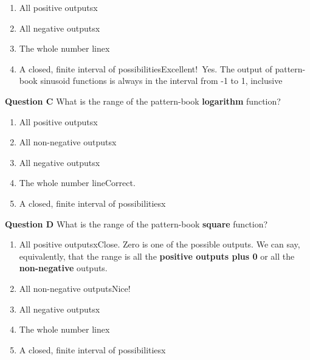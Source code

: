 \documentclass[
  letterpaper,
  DIV=11,
  numbers=noendperiod,
  oneside]{article}
\providecommand{\tightlist}{%
  \setlength{\itemsep}{0pt}\setlength{\parskip}{0pt}}\usepackage{longtable,booktabs,array}
\begin{document}
\begin{multicols}{2}
\begin{enumerate}
\def\labelenumi{\roman{enumi}.}
\tightlist
\item
  {All positive outputs{x}}\\
\item
  {All negative outputs{x}}\\
\item
  {The whole number line{x}}\\
\item
  {A closed, finite interval of possibilities{Excellent!~Yes. The output
  of pattern-book sinusoid functions is always in the interval from -1
  to 1, inclusive}}
\end{enumerate}

\textbf{Question C} What is the range of the pattern-book
\textbf{logarithm} function?

\begin{enumerate}
\def\labelenumi{\roman{enumi}.}
\tightlist
\item
  {All positive outputs{x}}\\
\item
  {All non-negative outputs{x}}\\
\item
  {All negative outputs{x}}\\
\item
  {The whole number line{Correct.~}}\\
\item
  {A closed, finite interval of possibilities{x}}
\end{enumerate}

\textbf{Question D} What is the range of the pattern-book
\textbf{square} function?

\begin{enumerate}
\def\labelenumi{\roman{enumi}.}
\tightlist
\item
  {All positive outputs{xClose. Zero is one of the possible outputs.
  We can say, equivalently, that the range is all the \textbf{positive
  outputs plus 0} or all the \textbf{non-negative} outputs.}}\\
\item
  {All non-negative outputs{Nice!~}}\\
\item
  {All negative outputs{x}}\\
\item
  {The whole number line{x}}\\
\item
  {A closed, finite interval of possibilities{x}}
\end{enumerate}


\end{multicols}
\end{document}
